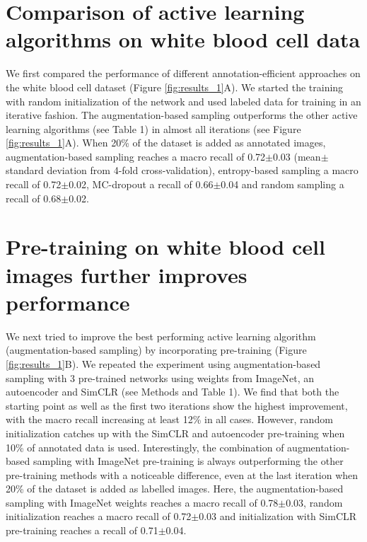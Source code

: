\section{Comparison of active learning algorithms on white blood cell data}
We first compared the performance of different annotation-efficient approaches on the white blood cell dataset (Figure \ref{fig:results_1}A). We started the training with random initialization of the network and used labeled data for training in an iterative fashion. The augmentation-based sampling outperforms the other active learning algorithms (see Table 1) in almost all iterations (see Figure \ref{fig:results_1}A). When 20\% of the dataset is added as annotated images, augmentation-based sampling reaches a macro recall of 0.72$\pm$0.03 (mean$\pm$standard deviation from 4-fold cross-validation), entropy-based sampling a macro recall of 0.72$\pm$0.02, MC-dropout a recall of 0.66$\pm$0.04 and random sampling a recall of 0.68$\pm$0.02.

\section{Pre-training on white blood cell images further improves performance}
We next tried to improve the best performing active learning algorithm (augmentation-based sampling) by incorporating pre-training (Figure \ref{fig:results_1}B). We repeated the experiment using augmentation-based sampling with 3 pre-trained networks using weights from ImageNet, an autoencoder and SimCLR (see Methods and Table 1). We find that both the starting point as well as the first two iterations show the highest improvement, with the macro recall increasing at least 12\% in all cases. However, random initialization catches up with the SimCLR and autoencoder pre-training when 10\% of annotated data is used. Interestingly, the combination of augmentation-based sampling with ImageNet pre-training is always outperforming the other pre-training methods with a noticeable difference, even at the last iteration when 20\% of the dataset is added as labelled images. Here, the  augmentation-based sampling with ImageNet weights reaches a macro recall of 0.78$\pm$0.03, random initialization reaches a macro recall of 0.72$\pm$0.03 and initialization with SimCLR pre-training reaches a recall of 0.71$\pm$0.04.


